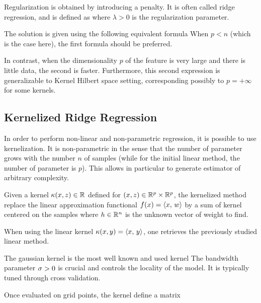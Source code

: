 Regularization is obtained by introducing a penalty. It is often called
ridge regression, and is defined as 
where $\lambda>0$ is the regularization parameter.

The solution is given using the following equivalent formula
When $p<n$ (which is the case here), the first formula should be
preferred. 

In contrast, when the dimensionality $p$ of the feature is very
large and there is little data, the second is faster. Furthermore, this
second expression is generalizable to Kernel Hilbert space setting,
corresponding possibly to $p=+\infty$ for some kernels. 


\subsection{Kernelized Ridge Regression}

In order to perform non-linear and non-parametric regression, it is
possible to use  kernelization. It is non-parametric in the sense that the number of
parameter grows with the number $n$ of samples (while for the initial
linear  method, the number of parameter is $p$). This allows in particular to
generate estimator of arbitrary complexity. 

Given a kernel $ \kappa(x,z) \in \mathbb{R} $ defined for $(x,z) \in \mathbb{R}^p \times \mathbb{R}^p$,
the kernelized method replace the linear approximation functional $f(x) =
\langle x,\,w\rangle$ by a sum of kernel centered on the samples 
where $h \in \mathbb{R}^n$ is the unknown vector of weight to find. 

When using the linear kernel $\kappa(x,y)=\langle x,\,y\rangle$, one retrieves
the previously studied linear method. 



The gaussian kernel is the most well known and used kernel
The bandwidth parameter $\sigma>0$ is crucial and controls the locality of
the model. It is typically tuned through cross validation.  

Once evaluated on grid points, the kernel define a matrix

